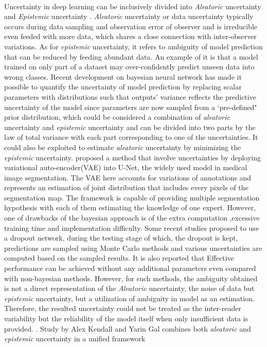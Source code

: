 \documentclass[12pt]{extarticle}
\begin{document}
\paragraph{}
Uncertainty in deep learning can be inclusively divided into \textit{Aleatoric}
uncertainty and \textit{Epistemic} uncertainty \cite{kendall2017uncertainties}.
\textit{Aleatoric} uncertainty or data uncertainty typically occurs during data sampling and
observation error of observer and is irreducible even feeded with more data, which shares a
close connection with inter-observer variations. As for \textit{epistemic}
uncertainty, it refers to ambiguity of model prediction that can be reduced by feeding abundant data.
An example of it is that a model trained on only part of a dataset may over-confidently
predict unseen data into wrong classes. Recent development on 
bayesian neural network has made it possible to quantify the 
uncertainty of model prediction by replacing scalar parameters with distributions such 
that outputs' variance reflects the predictive uncertainty of the model since parameters are now sampled 
from a `pre-defined" prior distribution, which could be considered a 
combination of \textit{aleatoric} uncertainty and \textit{epistemic} uncertainty 
and can be divided into two parts by the law of total variance with each part corresponding to 
one of the uncertainties. It could also be exploited to estimate \textit{aleatoric} uncertainty by 
minimizing the \textit{epistemic} uncertainty. \cite{kohl2019probabilistic} 
proposed a method that involve uncertainties by deploying variational 
auto-encoder(VAE) into U-Net, the widely used model in medical image segmentation\cite{ronneberger2015unet}. 
The VAE here accounts for variations of annotations and represents an 
estimation of joint distribution that includes every pixels of the segmentation map. 
The framework is capable of providing multiple segmentation 
hypothesis with each of them estimating the knowledge of one expert.
However, one of drawbacks of the bayesian approach is of the extra computation
,excessive training time and implementation difficulty. 
Some recent studies proposed to use a dropout network, during the testing stage of which, 
the dropout is kept, predictions are sampled using Monte Carlo methods 
and various uncertainties are computed based on the sampled results.
It is also reported that Effective performance can be achieved 
without any additional parameters even compared with non-bayesian methods. 
However, for such methods, the ambiguity obtained is
not a direct representation of the \textit{Aleatoric} uncertainty,
the noise of data but \textit{epistemic} uncertainty, but a utilization of ambiguity in model
\cite{kendall2017uncertainties} as an estimation. Therefore, the resulted uncertainty could not
be treated as the inter-reader variability but the reliability of 
the model itself when only insufficient data is provided. 
\cite{nair2018exploring}. Study by Alex Kendall and Yarin Gal \cite{kendall2017uncertainties} 
combines both \textit{aleatoric} and \textit{epistemic} uncertainty in a unified framework 
\end{document}
